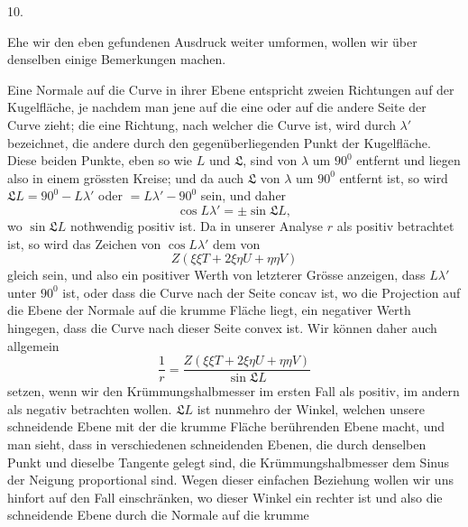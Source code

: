 %
\begin{center}10.\end{center}
\noindent\hspace*{1.2em}Ehe wir den eben gefundenen Ausdruck weiter umformen, wollen wir über denselben einige Bemerkungen machen.

Eine Normale auf die Curve in ihrer Ebene entspricht zweien Richtungen auf der Kugelfläche, je nachdem man jene auf die eine oder auf die andere Seite der Curve zieht; die eine Richtung, nach welcher die Curve  ist, wird durch $\lambda'$ bezeichnet, die andere durch den gegenüberliegenden Punkt der Kugelfläche. Diese beiden Punkte, eben so wie $L$ und $\mathfrak{L}$, sind von $\lambda$ um $90^{0}$ entfernt und liegen also in einem grössten Kreise; und da auch $\mathfrak{L}$ von $\lambda$ um $90^{0}$ entfernt ist, so wird $\mathfrak{L}L=90^{0}-L\lambda'$ oder $=L\lambda'-90^{0}$ sein, und daher
\[
\cos L\lambda'=\pm\sin\mathfrak{L}L,
\]
wo $\sin\mathfrak{L}L$ nothwendig positiv ist. Da in unserer Analyse $r$ als positiv betrachtet ist, so wird das Zeichen von $\cos L\lambda'$ dem von
\[
Z(\xi\xi T+2\xi\eta U+\eta\eta V)
\]
gleich sein, und also ein positiver Werth von letzterer Grösse anzeigen, dass $L\lambda'$ unter $90^{0}$ ist, oder dass die Curve nach der Seite concav ist, wo die Projection auf die Ebene der Normale auf die krumme Fläche liegt, ein negativer Werth hingegen, dass die Curve nach dieser Seite convex ist. Wir können daher auch allgemein
\[
\frac1r=\frac{Z(\xi\xi T+2\xi\eta U+\eta\eta V)}{\sin\mathfrak{L}L}
\]
setzen, wenn wir den Krümmungshalbmesser im ersten Fall als positiv, im andern als negativ betrachten wollen. $\mathfrak{L}L$ ist nunmehro der Winkel, welchen unsere schneidende Ebene mit der die krumme Fläche berührenden Ebene macht, und man sieht, dass in verschiedenen schneidenden Ebenen, die durch denselben Punkt und dieselbe Tangente gelegt sind, die Krümmungshalbmesser dem Sinus der Neigung proportional sind. Wegen dieser einfachen Beziehung wollen wir uns hinfort auf den Fall einschränken, wo dieser Winkel ein rechter ist und also die schneidende Ebene durch die Normale auf die krumme
